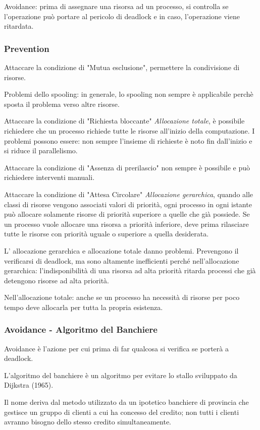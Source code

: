 Avoidance: prima di assegnare una risorsa ad un processo, si controlla se l'operazione può portare al pericolo di deadlock e in caso, l'operazione viene ritardata.

\subsubsection{Prevention}
Attaccare la condizione di "Mutua esclusione", permettere la condivisione di risorse.

Problemi dello spooling: in generale, lo spooling non sempre è applicabile perchè sposta il problema verso altre risorse.

Attaccare la condizione di "Richiesta bloccante"
\textit{Allocazione totale}, è possibile richiedere che un processo richiede tutte le risorse all'inizio della computazione.
I problemi possono essere: non sempre l'insieme di richieste è noto fin dall'inizio e si riduce il parallelismo.

Attaccare la condizione di "Assenza di prerilascio" non sempre è possibile e può richiedere interventi manuali.

Attaccare la condizione di "Attesa Circolare" \textit{Allocazione gerarchica}, quando alle classi di risorse vengono associati valori di priorità, ogni processo in ogni istante può allocare solamente risorse di priorità superiore a quelle che già possiede.
Se un processo vuole allocare una risorsa a priorità inferiore, deve prima rilasciare tutte le risorse con priorità uguale o superiore a quella desiderata.

L' allocazione gerarchica e allocazione totale danno problemi.
Prevengono il verificarsi di deadlock, ma sono altamente inefficienti perché nell'allocazione gerarchica: l'indisponibilità di una risorsa ad alta priorità ritarda processi che già
detengono risorse ad alta priorità.

Nell'allocazione totale: anche se un processo ha necessità di risorse per poco tempo deve allocarla per tutta la propria esistenza.

\subsubsection{Avoidance - Algoritmo del Banchiere}
Avoidance è l'azione per cui prima di far qualcosa si verifica se porterà a deadlock.

L'algoritmo del banchiere è un algoritmo per evitare lo stallo sviluppato da Dijkstra (1965). 

Il nome deriva dal metodo utilizzato da un ipotetico banchiere di provincia che gestisce un gruppo di clienti a cui ha concesso del credito; non tutti i clienti avranno bisogno dello stesso credito simultaneamente.
\newpage

